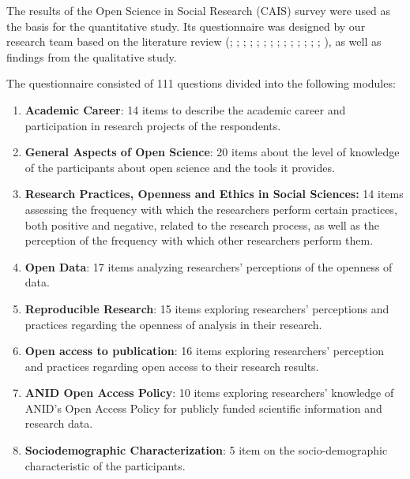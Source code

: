\documentclass[
  letterpaper,
]{article}
\providecommand{\tightlist}{%
  \setlength{\itemsep}{0pt}\setlength{\parskip}{0pt}}\usepackage{longtable,booktabs,array}
\begin{document}
The results of the Open Science in Social Research (CAIS) survey were
used as the basis for the quantitative study. Its questionnaire was
designed by our research team based on the literature review
(;
;
;
;
;
; ; ; ; ; ; ; ;
;
), as well as findings from
the qualitative study.

The questionnaire consisted of 111 questions divided into the following
modules:

\begin{enumerate}
\def\labelenumi{\arabic{enumi}.}
\tightlist
\item
  \textbf{Academic Career}: 14 items to describe the academic career and
  participation in research projects of the respondents.
\item
  \textbf{General Aspects of Open Science}: 20 items about the level of
  knowledge of the participants about open science and the tools it
  provides.
\item
  \textbf{Research Practices, Openness and Ethics in Social Sciences:}
  14 items assessing the frequency with which the researchers perform
  certain practices, both positive and negative, related to the research
  process, as well as the perception of the frequency with which other
  researchers perform them.
\item
  \textbf{Open Data}: 17 items analyzing researchers' perceptions of the
  openness of data.
\item
  \textbf{Reproducible Research}: 15 items exploring researchers'
  perceptions and practices regarding the openness of analysis in their
  research.
\item
  \textbf{Open access to publication}: 16 items exploring researchers'
  perception and practices regarding open access to their research
  results.
\item
  \textbf{ANID Open Access Policy}: 10 items exploring researchers'
  knowledge of ANID's Open Access Policy for publicly funded scientific
  information and research data.
\item
  \textbf{Sociodemographic Characterization}: 5 item on the
  socio-demographic characteristic of the participants.
\end{enumerate}
\end{document}

